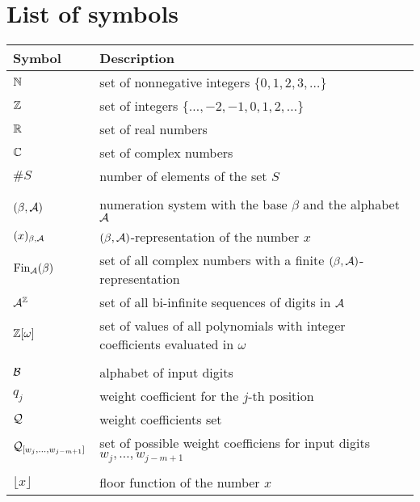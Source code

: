 \chapter*{List of symbols}
\begin{tabular}{ll}
Symbol        & Description \\ \hline
$\mathbb{N}$         & set of nonnegative integers $\{0,1,2,3,\dots\}$   \\
$\mathbb{Z}$         & set of integers $\{\dots,-2,-1,0,1,2,\dots\}$ \\
$\mathbb{R}$           & set of real numbers \\
$\mathbb{C}$           & set of complex numbers \\
$\#S$          & number of elements of the set $S$ \\
\rule{0cm}{0cm}& \\
$(\beta,\mathcal{A})$            & numeration system with the base $\beta$ and the alphabet $\mathcal{A}$\\
$(x)_{\beta,\mathcal{A}}$    &$(\beta,\mathcal{A})$-representation of the number $x$\\
$\text{Fin}_{\mathcal{A}}(\beta)$          &set of all complex numbers with a finite $(\beta,\mathcal{A})$-representation \\
$\mathcal{A}^{\mathbb{Z}}$        &set of all bi-infinite sequences of digits in $\mathcal{A}$\\
$\mathbb{Z}[\omega]$       &set of values of all polynomials with integer coefficients evaluated in $\omega$\\
\rule{0cm}{0cm}& \\
$\mathcal{B}$            &alphabet of input digits\\
$q_j$           &weight coefficient for the $j$-th position \\
$\mathcal{Q}$            &weight coefficients set\\
$\mathcal{Q}_{[w_{j},\dots, w_{j-m+1}]}$ &set of possible weight coefficiens for input digits $w_{j},\dots, w_{j-m+1}$ \\
\rule{0cm}{0cm}& \\
$\lfloor x \rfloor$ & floor function of the number $x$ \\  
\end{tabular}
